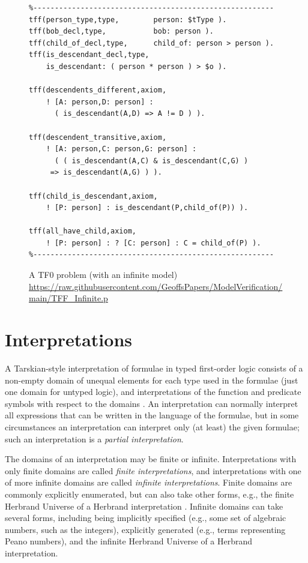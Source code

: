 \documentclass[letterpaper]{article}
\begin{document}
\begin{figure}[htbp]
\scriptsize
{}
\begin{verbatim}
%--------------------------------------------------------
tff(person_type,type,        person: $tType ).
tff(bob_decl,type,           bob: person ).
tff(child_of_decl,type,      child_of: person > person ).
tff(is_descendant_decl,type, 
    is_descendant: ( person * person ) > $o ).

tff(descendents_different,axiom,
    ! [A: person,D: person] : 
      ( is_descendant(A,D) => A != D ) ).

tff(descendent_transitive,axiom,
    ! [A: person,C: person,G: person] :
      ( ( is_descendant(A,C) & is_descendant(C,G) ) 
     => is_descendant(A,G) ) ).

tff(child_is_descendant,axiom,
    ! [P: person] : is_descendant(P,child_of(P)) ).

tff(all_have_child,axiom,
    ! [P: person] : ? [C: person] : C = child_of(P) ).
%--------------------------------------------------------
\end{verbatim}
\caption{A TF0 problem (with an infinite model)\\
{\scriptsize \url{https://raw.githubusercontent.com/GeoffsPapers/ModelVerification/main/TFF_Infinite.p}}}
\label{TF0InfiniteProblem}
\end{figure}

\section{Interpretations}
\label{Interpretations}

A Tarskian-style interpretation \cite{TV56} of formulae in typed first-order logic consists of a 
non-empty domain of unequal elements for each type used in the formulae (just one domain for 
untyped logic), and interpretations of the function and predicate symbols with respect to the 
domains \cite{Hun96}.
An interpretation can normally interpret all expressions that can be written in the language of 
the formulae, but in some circumstances an interpretation can interpret only (at least) the given 
formulae; such an interpretation is a {\em partial interpretation}.

The domains of an interpretation may be finite or infinite.
Interpretations with only finite domains are called {\em finite interpretations}, and
interpretations with one of more infinite domains are called {\em infinite interpretations}.
Finite domains are commonly explicitly enumerated, but can also take other forms, e.g., the 
finite Herbrand Universe of a Herbrand interpretation \cite{Her30}.
Infinite domains can take several forms, including being implicitly specified (e.g., some set
of algebraic numbers, such as the integers), explicitly generated (e.g., terms representing 
Peano numbers), and the infinite Herbrand Universe of a Herbrand interpretation.
\end{document}
